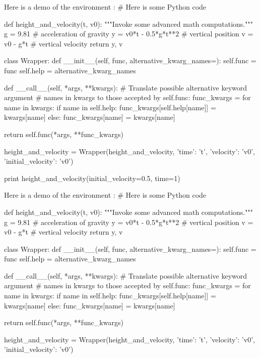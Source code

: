 \noindent
Here is a demo of the environment :
# Here is some Python code

def height_and_velocity(t, v0):
    """Invoke some advanced math computations."""
    g = 9.81                  # acceleration of gravity
    y = v0*t - 0.5*g*t**2     # vertical position
    v = v0 - g*t              # vertical velocity
    return y, v

class Wrapper:
    def __init__(self, func, alternative_kwarg_names={}):
        self.func = func
        self.help = alternative_kwarg_names

    def __call__(self, *args, **kwargs):
        # Translate possible alternative keyword argument
        # names in kwargs to those accepted by self.func:
        func_kwargs = {}
        for name in kwargs:
            if name in self.help:
                func_kwargs[self.help[name]] = kwargs[name]
            else:
                func_kwargs[name] = kwargs[name]

        return self.func(*args, **func_kwargs)

height_and_velocity = Wrapper(height_and_velocity,
                              {'time': 't',
                               'velocity': 'v0',
                               'initial_velocity': 'v0'})

print height_and_velocity(initial_velocity=0.5, time=1)


\noindent
Here is a demo of the environment :
# Here is some Python code

def height_and_velocity(t, v0):
    """Invoke some advanced math computations."""
    g = 9.81                  # acceleration of gravity
    y = v0*t - 0.5*g*t**2     # vertical position
    v = v0 - g*t              # vertical velocity
    return y, v

class Wrapper:
    def __init__(self, func, alternative_kwarg_names={}):
        self.func = func
        self.help = alternative_kwarg_names

    def __call__(self, *args, **kwargs):
        # Translate possible alternative keyword argument
        # names in kwargs to those accepted by self.func:
        func_kwargs = {}
        for name in kwargs:
            if name in self.help:
                func_kwargs[self.help[name]] = kwargs[name]
            else:
                func_kwargs[name] = kwargs[name]

        return self.func(*args, **func_kwargs)

height_and_velocity = Wrapper(height_and_velocity,
                              {'time': 't',
                               'velocity': 'v0',
                               'initial_velocity': 'v0'})

